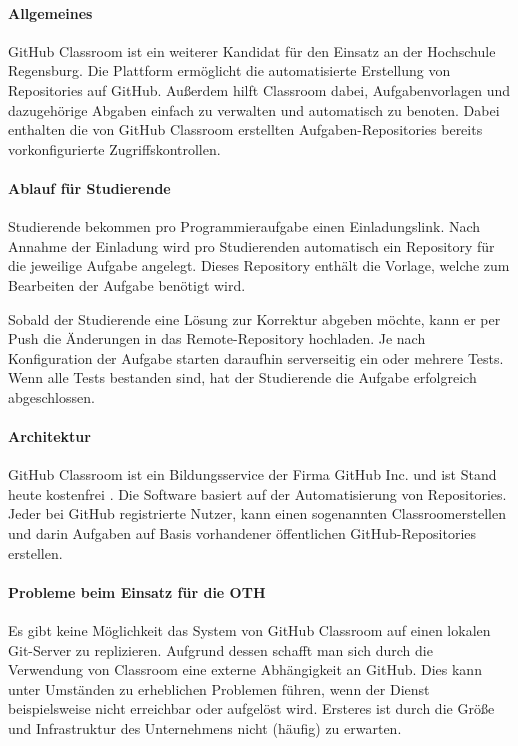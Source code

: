 \paragraph{Allgemeines}
GitHub Classroom ist ein weiterer Kandidat für den Einsatz an der
Hochschule Regensburg. Die Plattform ermöglicht die automatisierte
Erstellung von Repositories auf GitHub. Außerdem hilft Classroom dabei,
Aufgabenvorlagen und dazugehörige Abgaben einfach zu verwalten und automatisch
zu benoten. Dabei enthalten die von GitHub Classroom erstellten
Aufgaben-Repositories bereits vorkonfigurierte Zugriffskontrollen. \parencite{github-classroom-startseite}

\paragraph{Ablauf für Studierende}
Studierende bekommen pro Programmieraufgabe einen Einladungslink.
Nach Annahme der Einladung wird pro Studierenden automatisch ein Repository für
die jeweilige Aufgabe angelegt. Dieses Repository enthält die Vorlage,
welche zum Bearbeiten der Aufgabe benötigt wird.

Sobald der Studierende eine Lösung zur Korrektur abgeben möchte, kann er per
Push die Änderungen in das Remote-Repository hochladen. Je nach Konfiguration
der Aufgabe starten daraufhin serverseitig ein oder mehrere Tests. Wenn alle
Tests bestanden sind, hat der Studierende die Aufgabe erfolgreich abgeschlossen.

\paragraph{Architektur} %
GitHub Classroom ist ein Bildungsservice der Firma GitHub Inc. und ist Stand
heute kostenfrei \parencite{github-classroom-kostenlos}. Die Software basiert
auf der Automatisierung von Repositories. Jeder bei GitHub registrierte Nutzer,
kann einen sogenannten \glqq Classroom\grqq erstellen und darin Aufgaben auf
Basis vorhandener öffentlichen GitHub-Repositories erstellen.

\paragraph{Probleme beim Einsatz für die OTH}
Es gibt keine Möglichkeit das System von GitHub Classroom auf einen lokalen
Git-Server zu replizieren. Aufgrund dessen schafft man sich durch die
Verwendung von Classroom eine externe Abhängigkeit an GitHub. Dies kann unter
Umständen zu erheblichen Problemen führen, wenn der Dienst beispielsweise
nicht erreichbar oder aufgelöst wird. Ersteres ist durch die Größe und
Infrastruktur des Unternehmens nicht (häufig) zu erwarten.

